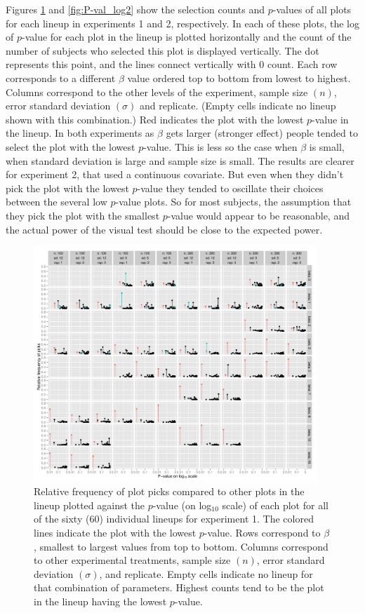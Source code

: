 \documentclass{article}
\begin{document}
Figures \ref{fig:P-val_log} and \ref{fig:P-val_log2} show the selection counts and $p$-values of all plots for each lineup in experiments 1 and 2, respectively. In each of these plots, the log of $p$-value for each plot in the lineup is plotted horizontally and the count of the number of subjects who selected this plot is displayed vertically. The dot represents this point, and the lines connect vertically with 0 count. Each row corresponds to a different $\beta$ value ordered top to bottom from lowest to highest. Columns correspond to the other levels of the experiment, sample size $(n)$, error standard deviation $(\sigma)$ and replicate. (Empty cells indicate no lineup shown with this combination.) Red indicates the plot with the lowest $p$-value in the lineup. In both experiments as $\beta$ gets larger (stronger effect) people tended to select the plot with the lowest $p$-value. This is less so the case when $\beta$ is small, when standard deviation is large and sample size is small. The results are clearer for experiment 2, that used a continuous covariate. But even when they didn't pick the plot with the lowest $p$-value they tended to oscillate their choices between the several low $p$-value plots. So for most subjects, the assumption that they pick the plot with the smallest $p$-value would appear to be reasonable, and the actual power of the visual test should be close to the expected power.

\begin{figure}[hbtp]
   \centering
       \includegraphics[width=0.95\textwidth]{p_val_log_counts.pdf}
       \caption{Relative frequency of plot picks compared to other plots in the lineup plotted against the $p$-value (on log$_{10}$ scale) of each plot for all of the sixty (60) individual lineups for experiment 1. The colored lines indicate the plot with the lowest $p$-value. Rows correspond to $\beta$, smallest to largest values from top to bottom. Columns correspond to other experimental treatments, sample size $(n)$, error standard deviation $(\sigma)$, and replicate. Empty cells indicate no lineup for that combination of parameters. Highest counts tend to be the plot in the lineup having the lowest $p$-value.}
       \label{fig:P-val_log}
\end{figure}
\end{document}
